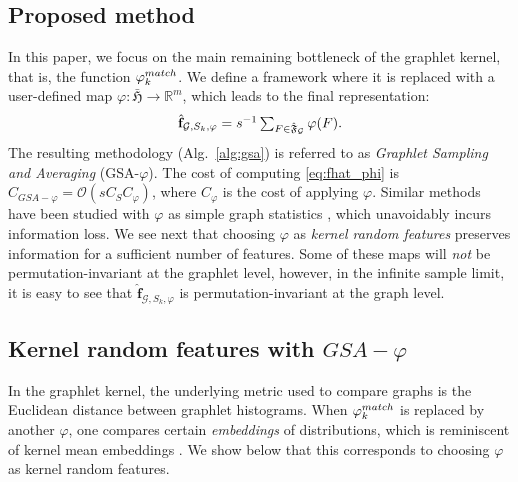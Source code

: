 \documentclass{article}
\begin{document}
\subsection{Proposed method}
\label{sec:algo}
In this paper, we focus on the main remaining bottleneck of the graphlet kernel, that is, the function $\varphi^{match}_k$. We define a framework where it is replaced with a user-defined map $\varphi: \bar{\mathfrak{H}} \to \mathbb{R}^m$, which leads to the final representation:
\begin{align}
	\label{eq:fhat_phi}
	\mathsmaller{\hat{\mathbf{f}}_{\mathcal{G},S_k,\varphi} =s^{-1}\sum_{F\in\hat{\mathfrak{F}}_\G} \varphi(F).}
\end{align}
The resulting methodology (Alg.~\ref{alg:gsa}) is referred to as \emph{Graphlet Sampling and Averaging} (GSA-$\varphi$). The cost of computing \eqref{eq:fhat_phi} is $C_{GSA-\varphi}= \mathcal{O}\left(s C_S C_{\varphi}\right)$, where $C_{\varphi}$ is the cost of applying $\varphi$.
%
%
Similar methods have been studied with $\varphi$ as simple graph statistics \cite{Dutta2018}, which unavoidably incurs information loss. We see next that choosing $\varphi$ as \emph{kernel random features} preserves information for a sufficient number of features. Some of these maps will \emph{not} be permutation-invariant at the graphlet level, however, in the infinite sample limit, it is easy to see that $\hat{\mathbf{f}}_{\mathcal{G},S_k,\varphi}$ is permutation-invariant at the graph level.

\subsection{Kernel random features with $GSA-\varphi$} 
\label{sec:MMD}

In the graphlet kernel, the underlying metric used to compare graphs is the Euclidean distance between graphlet histograms. When $\varphi^{match}_k$ is replaced by another $\varphi$, one compares certain \emph{embeddings} of distributions, which is reminiscent of kernel mean embeddings \cite{Gretton2007}. We show below that this corresponds to choosing $\varphi$ as kernel random features.
\end{document}
